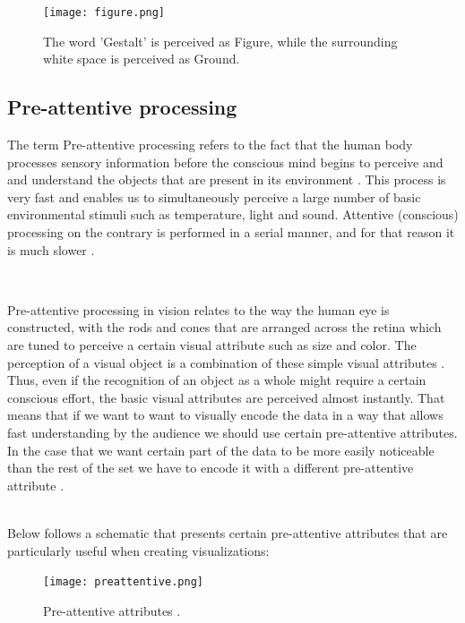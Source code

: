 \documentclass[16pt]{extreport}
\begin{document}
	\begin{center}
	\begin{figure}[h]
		\centering
		\texttt{[image: figure.png]}
		\caption[]{The word 'Gestalt' is perceived as Figure, while the surrounding white space is perceived as Ground.}
	\end{figure}
	\end{center}
	\clearpage
\subsection{Pre-attentive processing}
\parbox{\linewidth}{
\justify
\large{
The term Pre-attentive processing refers to the fact that the human body processes sensory information before the conscious mind begins to perceive and and understand the objects that are present in its environment \cite{preattentive}. This process is very fast and enables us to simultaneously perceive a large number of basic environmental stimuli such as temperature, light and sound. Attentive (conscious) processing on the contrary is performed in a serial manner, and for that reason it is much slower \cite{treisman}.}}
\hfill \break\\
\parbox{\linewidth}{
\justify
\large{
Pre-attentive processing in vision relates to the way the human eye is constructed, with the rods and cones that are arranged across the retina which are tuned to perceive a certain visual attribute such as size and color.  
The perception of a visual object is a combination of these simple visual attributes . Thus, even if the recognition of an object as a whole might require a certain conscious effort, the basic visual attributes are perceived almost instantly. That means that if we want to want to visually encode the data in a way that allows fast understanding by the audience we should use certain pre-attentive attributes. In the case that we want certain part of the data to be more easily noticeable than the rest of the set we have to encode it with a different pre-attentive attribute \cite{few1}.
}}
\hfill \break\\
Below follows a schematic that presents certain pre-attentive attributes that are particularly useful when creating visualizations:

\begin{center}
	\begin{figure}[h]
		\texttt{[image: preattentive.png]}
		\caption[]{Pre-attentive attributes \footnotemark .}
	\end{figure}
\end{center}
\end{document}
